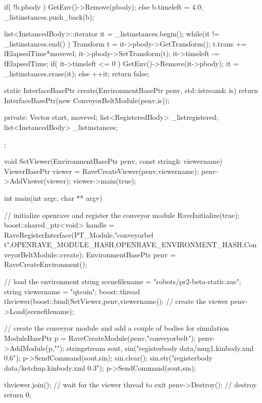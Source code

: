 \begin{DoxyCodeInclude}
{{{{                if( !b.pbody ) {
                    GetEnv()->Remove(pbody);
                }
                else {
                    b.timeleft = 4.0;
                    _listinstances.push_back(b);
                }
            }
        }

        list<InstancedBody>::iterator it = _listinstances.begin();
        while(it != _listinstances.end() ) {
            Transform t = it->pbody->GetTransform();
            t.trans += fElapsedTime*movevel;
            it->pbody->SetTransform(t);
            it->timeleft -= fElapsedTime;
            if( it->timeleft <= 0 ) {
                GetEnv()->Remove(it->pbody);
                it = _listinstances.erase(it);
            }
            else {
                ++it;
            }
        }
        return false;
    }

    static InterfaceBasePtr create(EnvironmentBasePtr penv, std::istream& is)
    {
        return InterfaceBasePtr(new ConveyorBeltModule(penv,is));
    }

private:
    Vector start, movevel;
    list<RegisteredBody> _listregistered;
    list<InstancedBody> _listinstances;
};

void SetViewer(EnvironmentBasePtr penv, const string& viewername)
{
    ViewerBasePtr viewer = RaveCreateViewer(penv,viewername);
    penv->AddViewer(viewer);
    viewer->main(true);
}

int main(int argc, char ** argv)
{
    // initialize openrave and register the conveyor module
    RaveInitialize(true);
    boost::shared_ptr<void> handle = RaveRegisterInterface(PT_Module,"conveyorbel
      t",OPENRAVE_MODULE_HASH,OPENRAVE_ENVIRONMENT_HASH,ConveyorBeltModule::create);
    EnvironmentBasePtr penv = RaveCreateEnvironment();

    // load the environment
    string scenefilename = "robots/pr2-beta-static.zae";
    string viewername = "qtcoin";
    boost::thread thviewer(boost::bind(SetViewer,penv,viewername)); // create the
       viewer
    penv->Load(scenefilename);

    // create the conveyor module and add a couple of bodies for simulation
    ModuleBasePtr p = RaveCreateModule(penv,"conveyorbelt");
    penv->AddModule(p,"");
    stringstream sout, sin("registerbody data/mug1.kinbody.xml 0.6");
    p->SendCommand(sout,sin);
    sin.clear();
    sin.str("registerbody data/ketchup.kinbody.xml 0.3");
    p->SendCommand(sout,sin);

    thviewer.join(); // wait for the viewer thread to exit
    penv->Destroy(); // destroy
    return 0;
}
\end{DoxyCodeInclude}
 